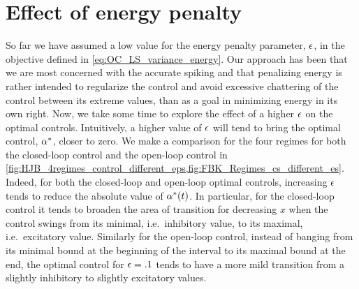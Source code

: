 \documentclass{article}
\begin{document}

\clearpage
\section{Effect of energy penalty}
\label{sec:effect_of_eps}
So far we have assumed a low value for the energy penalty parameter,
${\epsilon}$, in the objective defined in \cref{eq:OC_LS_variance_energy}. Our
approach has been that we are most concerned with the accurate spiking and that
penalizing energy is rather intended to regularize the control and avoid
excessive chattering of the control between its extreme values, than as a goal
in minimizing energy in its own right. Now, we take some time to explore the
effect of a higher ${\epsilon}$ on the optimal controls. Intuitively, a
higher value of ${\epsilon}$ will tend to bring the optimal control, ${\alpha}^*$, closer
to zero. We make a comparison for the four regimes for both the
closed-loop control and the open-loop control in
\cref{fig:HJB_4regimes_control_different_eps,fig:FBK_Regimes_cs_different_es}.
Indeed, for both the closed-loop and open-loop optimal controls, increasing
${\epsilon}$ tends to reduce the absolute value of ${\alpha}^*(t)$. In particular, for the
closed-loop control it tends to broaden the area of transition for
decreasing $x$ when the control swings from its minimal, i.e.\ inhibitory value,
to its maximal, i.e.\ excitatory value. Similarly for the open-loop control,
instead of banging from its minimal bound at the beginning of the interval to
its maximal bound at the end, the optimal control for ${\epsilon} = .1$ tends to have a
more mild transition from a slightly inhibitory to slightly excitatory
values. 
\end{document}
